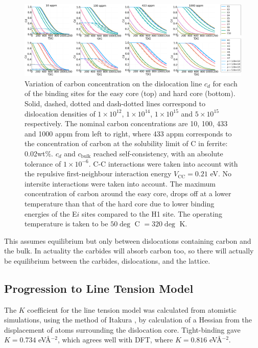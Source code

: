 \documentclass[a4paper,11pt]{article}
\begin{document}
\begin{landscape}
   \begin{figure}	
      \includegraphics[width=1.8\textwidth]{Images/mcclean_isotherm_all.png} 		
   \caption{ Variation of carbon concentration on the dislocation line $c_d$ for each of the binding sites for the easy core (top) and hard core (bottom). Solid, dashed, dotted and dash-dotted lines correspond to dislocation densities of $1\times10^{12}$, $1\times10^{14}$, $1\times10^{15}$ and $5\times10^{15}$ respectively. The nominal carbon concentrations are 10, 100, 433 and 1000 appm from left to right, where 433 appm corresponds to the concentration of carbon at the solubility limit of C in ferrite: 0.02wt\%. $c_d$ and $c_{\text{bulk}}$ reached self-consistency, with an absolute tolerance of $1\times10^{-6}$. C-C interactions were taken into account with the repulsive first-neighbour interaction energy $V_{\text{CC}}=0.21$ eV. No intersite interactions were taken into account. The maximum concentration of carbon around the easy core, drops off at a lower temperature than that of the hard core due to lower binding energies of the E$i$ sites compared to the H1 site. The operating temperature is taken to be $50\deg$ C $= 320 \deg$ K. }
   \label{cdhardeasy}
      \end{figure}
      \end{landscape}

This assumes equilibrium but only between dislocations containing carbon and the
bulk. In actuality the carbides will absorb carbon too, so there will actually be
equilibrium between the carbides, dislocations, and the lattice.






\subsection{Progression to Line Tension Model}
\label{sec:orgc713da6}


The \(K\) coefficient for the line tension model was calculated from atomistic simulations, using
the method of Itakura \cite{Itakura2012}, by calculation of a Hessian from the displacement of
atoms surrounding the dislocation core. Tight-binding gave \(K = 0.734\) eV\AA{}\(^{-2}\), which agrees well
with DFT, where \(K = 0.816\) eV\AA{}\(^{-2}\).
\end{document}
